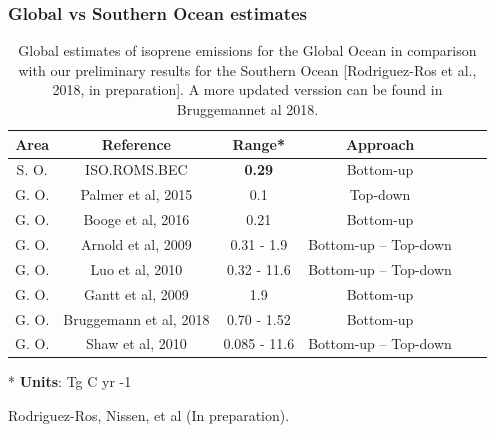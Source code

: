 \documentclass{beamer}
\begin{document}
\begin{frame}
\frametitle{Global vs Southern Ocean estimates}

\begin{center}

\begin{table}[h!]

\centering

\caption{Global estimates of isoprene emissions for the Global Ocean in comparison with our preliminary results for the Southern Ocean [Rodriguez-Ros et al., 2018, in preparation]. A more updated verssion can be found in Bruggemannet al 2018.}

\label{tab:global}

\begin{tabular}[ht]{ c|c|c|c|c|c } 

\textbf{Area} & \textbf{Reference} & \textbf{Range*} & \textbf{Approach} \\\hline

S. O. & ISO.ROMS.BEC & \textbf{0.29}  & 	 Bottom-up  \\
G. O. & Palmer et al, 2015  & 0.1   & Top-down \\
G. O. & Booge et al, 2016 & 0.21 &   Bottom-up\\
G. O. & Arnold et al, 2009 & 0.31 - 1.9 &  Bottom-up -- Top-down \\
G. O.  & Luo et al, 2010 & 0.32 - 11.6  &  Bottom-up -- Top-down \\
G. O.  & Gantt et al, 2009 & 1.9 &  Bottom-up\\
G. O.  & Bruggemann et al, 2018 & 0.70 - 1.52 & Bottom-up  \\
G. O.  & Shaw et al, 2010 & 0.085 - 11.6 & Bottom-up -- Top-down \\
\end{tabular}
\bigskip
* \textbf{Units}:  Tg C yr -1 

\end{table}

\end{center}
\tiny  Rodriguez-Ros, Nissen, et al (In preparation).

\end{frame}
\end{document}
